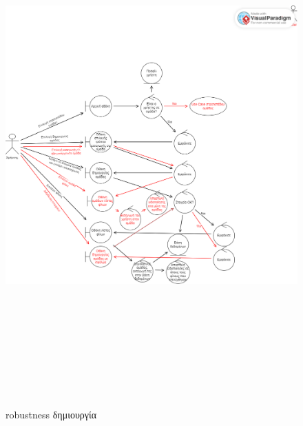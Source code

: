 \begin{figure}[!htb]
  \centering
    \centering
    \includegraphics[width=20cm,height=20cm]{robust_dhmiourgia.png}
    \caption{robustness δημιουργία}
    \label{}
\end{figure}
